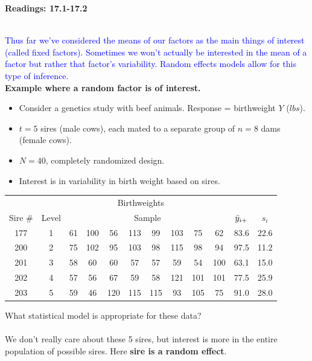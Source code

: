 \begin{center}\large\textbf{Readings: 17.1-17.2}\\
\normalsize \end{center}
\large ~\hrulefill
~\\
\textcolor{blue}{Thus far we've considered the means of our factors as the main things of interest (called fixed factors).  Sometimes we won't actually be interested in the mean of a factor but rather that factor's variability.  Random effects models allow for this type of inference.}\\

\textbf{Example where a random factor is of interest.}
\begin{itemize}
\item Consider a genetics study with beef animals.  Response = birthweight $Y$ ($lbs$).
\item $t=5$ sires (male cows), each mated to a separate group of $n=8$ dams (female cows).
\item $N=40$, completely randomized design. 
\item Interest is in variability in birth weight based on sires.
\end{itemize}
\begin{center}
\begin{tabular}{cc|cccccccc|c|c}
\multicolumn{12}{c}{Birthweights} \\
Sire \# & Level & \multicolumn{8}{c|}{Sample} & $\bar{y}_{i +}$ & $s_i$ \\ \hline
177 & 1 & 61 & 100 & 56 & 113 & 99 & 103 & 75 & 62 & 83.6 & 22.6 \\
200 & 2 & 75 & 102 & 95 & 103 & 98 & 115 & 98 & 94 & 97.5 & 11.2\\
201 & 3 & 58 & 60  & 60 & 57 & 57 & 59 & 54 & 100 &  63.1 & 15.0\\
202 & 4 & 57 & 56  & 67 & 59 & 58 & 121 & 101 & 101& 77.5 & 25.9\\
203 & 5 & 59 & 46  & 120 & 115 & 115 & 93 & 105 & 75&91.0 & 28.0 \\ \hline 
\end{tabular}
\end{center}
What statistical model is appropriate for these data?  \\~\\
\newpage
We don't really care about these 5 sires, but interest is more in the entire population of possible sires.  Here \textbf{sire is a random effect}.

